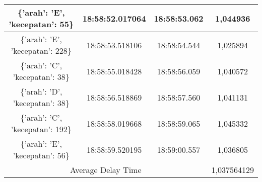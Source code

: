 \begin{table}[H]
\begin{tabular}{|ccc|c|}
    \multicolumn{1}{|c|}{\{'arah': 'E', 'kecepatan': 55\}}  & \multicolumn{1}{c|}{18:58:52.017064} & 18:58:53.062       & 1,044936    \\ \hline
    \multicolumn{1}{|c|}{\{'arah': 'E', 'kecepatan': 228\}} & \multicolumn{1}{c|}{18:58:53.518106} & 18:58:54.544       & 1,025894    \\ \hline
    \multicolumn{1}{|c|}{\{'arah': 'C', 'kecepatan': 38\}}  & \multicolumn{1}{c|}{18:58:55.018428} & 18:58:56.059       & 1,040572    \\ \hline
    \multicolumn{1}{|c|}{\{'arah': 'D', 'kecepatan': 38\}}  & \multicolumn{1}{c|}{18:58:56.518869} & 18:58:57.560       & 1,041131    \\ \hline
    \multicolumn{1}{|c|}{\{'arah': 'C', 'kecepatan': 192\}} & \multicolumn{1}{c|}{18:58:58.019668} & 18:58:59.065       & 1,045332    \\ \hline
    \multicolumn{1}{|c|}{\{'arah': 'E', 'kecepatan': 56\}}  & \multicolumn{1}{c|}{18:58:59.520195} & 18:59:00.557       & 1,036805    \\ \hline
    \multicolumn{3}{|c|}{Average Delay Time}                                                                            & 1,037564129 \\ \hline
  \end{tabular}
\end{table}